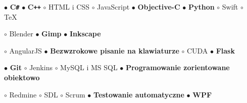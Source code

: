 \documentclass[11pt,a4paper]{article}
\begin{document}
    \smallskip
    $\bullet$ {\bf C\texttt{\#}}
    \hspace{0.5cm}
    $\bullet$ {\bf C\texttt{++}}
    \hspace{0.5cm}
    $\circ$ HTML i CSS
    \hspace{0.5cm}
    $\circ$ JavaScript
    \hspace{0.5cm}
    $\bullet$ {\bf Objective-C}
    \hspace{0.5cm}
    $\bullet$ {\bf Python}
    \hspace{0.5cm}
    $\circ$ Swift
    \hspace{0.5cm}
    $\circ$ TeX


    \smallskip


    \smallskip
    $\circ$ Blender
    \hspace{0.5cm}
    $\bullet$ {\bf Gimp}
    \hspace{0.5cm}
    $\bullet$ {\bf Inkscape}


    \smallskip


    \smallskip
    $\circ$ AngularJS
    \hspace{0.5cm}
    $\bullet$ {\bf Bezwzrokowe pisanie na klawiaturze}
    \hspace{0.5cm}
    $\circ$ CUDA
    \hspace{0.5cm}
    $\bullet$ {\bf Flask}

    \vspace{0.04cm}
    $\bullet$ {\bf Git}
    \hspace{0.5cm}
    $\circ$ Jenkins
    \hspace{0.5cm}
    $\circ$ MySQL i MS SQL
    \hspace{0.5cm}
    $\bullet$ {\bf Programowanie zorientowane obiektowo}

    \vspace{0.04cm}
    $\circ$ Redmine
    \hspace{0.5cm}
    $\circ$ SDL
    \hspace{0.5cm}
    $\circ$ Scrum
    \hspace{0.5cm}
    $\bullet$ {\bf Testowanie automatyczne}
    \hspace{0.5cm}
    $\bullet$ {\bf WPF}
  
\end{document}
